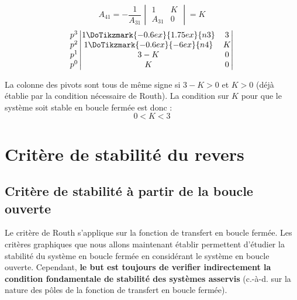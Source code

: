 \[
A_{41}=-\dfrac{1}{A_{31}}\begin{vmatrix} 1 & K \\ A_{31} & 0 \end{vmatrix}=K
\]
\[
\begin{matrix}
    p^3 \\
    p^2 \\
    p^1 \\
    p^0 \\
\end{matrix}
\begin{vmatrix}
    1\DoTikzmark{-0.6ex}{1.75ex}{n3}   & 3  \\
    1\DoTikzmark{-0.6ex}{-6ex}{n4}     & K  \\
    3-K                      & 0  \\
    K                        & 0    
    \end{vmatrix}
\]

La colonne des pivots sont tous de même signe si $3-K>0$ et $K>0$ (déjà établie 
par la condition nécessaire de Routh). La condition sur $K$ pour que le 
système soit stable en boucle fermée est donc :
\[
    0<K<3
\]
\section{Critère de stabilité du revers}
\subsection{Critère de stabilité à partir de la boucle ouverte}
Le critère de Routh s'applique sur la fonction de transfert en boucle fermée.
Les critères graphiques que nous allons maintenant établir 
permettent d'étudier la stabilité du système en boucle fermée en considérant 
le système en boucle ouverte. Cependant, \textbf{le but est toujours de verifier
indirectement la condition fondamentale de stabilité des systèmes asservis}
(c.-à-d. sur la nature des pôles de la fonction de transfert en boucle fermée).

